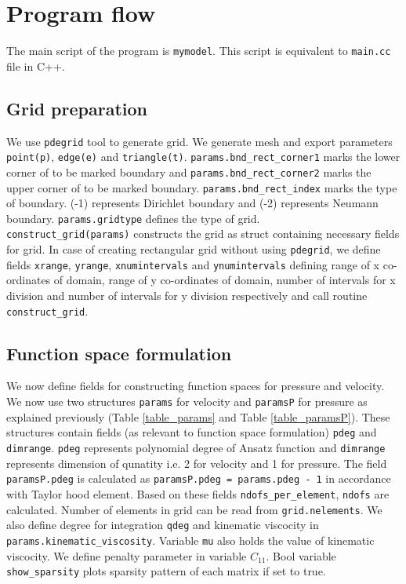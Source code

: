 \documentclass[a4paper]{book}
\begin{document}
\section{Program flow}

The main script of the program is \verb|mymodel|. This script is equivalent to \verb|main.cc| file in C++.

\subsection{Grid preparation}

We use \verb|pdegrid| tool to generate grid. We generate mesh and export parameters \verb|point(p)|, \verb|edge(e)| and \verb|triangle(t)|. \verb|params.bnd_rect_corner1| marks the lower corner of to be marked boundary and \verb|params.bnd_rect_corner2| marks the upper corner of to be marked boundary. \verb|params.bnd_rect_index| marks the type of boundary. (-1) represents Dirichlet boundary and (-2) represents Neumann boundary. \verb|params.gridtype| defines the type of grid. \\

\verb|construct_grid(params)| constructs the grid as struct containing necessary fields for grid. In case of creating rectangular grid without using \verb|pdegrid|, we define fields \verb|xrange|, \verb|yrange|, \verb|xnumintervals| and \verb|ynumintervals| defining range of x co-ordinates of domain, range of y co-ordinates of domain, number of intervals for x division and number of intervals for y division respectively and call routine \verb|construct_grid|.

\subsection{Function space formulation}

We now define fields for constructing function spaces for pressure and velocity. We now use two structures \verb|params| for velocity and \verb|paramsP| for pressure as explained previously (Table \ref{table_params} and Table \ref{table_paramsP}). These structures contain fields (as relevant to function space formulation) \verb|pdeg| and \verb|dimrange|. \verb|pdeg| represents polynomial degree of Ansatz function and \verb|dimrange| represents  dimension of qunatity i.e. 2 for velocity and 1 for pressure. The field \verb|paramsP.pdeg| is calculated as \verb|paramsP.pdeg = params.pdeg - 1| in accordance with Taylor hood element. Based on these fields \verb|ndofs_per_element|, \verb|ndofs| are calculated. Number of elements in grid can be read from \verb|grid.nelements|. We also define degree for integration \verb|qdeg| and kinematic viscocity in \verb|params.kinematic_viscosity|. Variable \verb|mu| also holds the value of kinematic viscocity. We define penalty parameter in variable $C_{11}$. Bool variable \verb|show_sparsity| plots sparsity pattern of each matrix if set to true.\\
\end{document}
